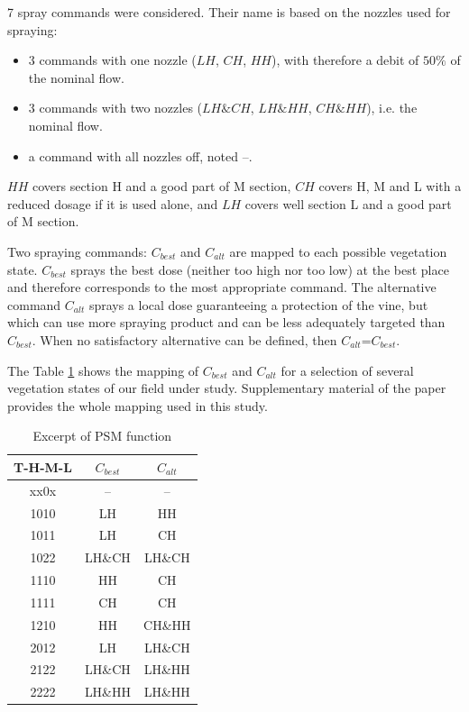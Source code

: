 \documentclass[preprint,3p,times,twocolumn]{elsarticle}
\begin{document}
7 spray commands were considered. Their name is based on the nozzles used for spraying:
\begin{itemize}
\item 3 commands with one nozzle ($LH$, $CH$, $HH$), with therefore a debit of $ 50 \% $ of the nominal flow.
\item 3 commands with two nozzles ($ LH \& CH $, $ LH \& HH $, $ CH \& HH $), i.e. the nominal flow.
\item a command with all nozzles off, noted --.
\end{itemize}

$HH$ covers section H and a good part of M section, $CH$ covers H, M and L with a reduced dosage if it is used alone, and $LH$ covers well section L and a good part of M section.

Two spraying commands: $C_{best}$ and $C_{alt}$ are mapped to each possible vegetation state. 
$C_{best}$ sprays the best dose (neither too high nor too low) at the best place and therefore corresponds to the most appropriate command. The alternative command $C_{alt}$ sprays a local dose guaranteeing a protection of the vine, but which can use more spraying product and can be less adequately targeted than $C_{best}$. When no satisfactory alternative can be defined, then $C_{alt}$=$C_{best}$. 


The Table \ref{tb:PSM} shows the mapping of $C_{best}$ and $C_{alt}$ for a selection of several vegetation states of our field under study. Supplementary material of the paper provides the whole mapping used in this study.

\begin{table}[h!]
\begin{center}
	\begin{tabular}{|c|c|c|}
		\hline 
		T-H-M-L	&	$C_{best}$	&	$C_{alt}$	\\ \hline
		\rowcolor{yellow} xx0x	&	--	& --	\\ \hline
		1010	&	LH	&	HH	\\ \hline
		1011	&	LH	&	CH	\\ \hline
		
		\rowcolor{green} 1022	&	LH\&CH	&	LH\&CH	\\ \hline
		\rowcolor{green} 1110	&	HH	&	CH	\\ \hline
		\rowcolor{green} 1111	&	CH	&	CH	\\ \hline
		1210	&	HH	&	CH\&HH	\\ \hline
		2012	&	LH	&	LH\&CH	\\ \hline
		2122	&	LH\&CH	&	LH\&HH	\\ \hline %
		2222	&	LH\&HH	&	LH\&HH	\\ \hline
	\end{tabular} 
	\caption{Excerpt of PSM function  }\label{tb:PSM}
\end{center}
\end{table}
\end{document}
